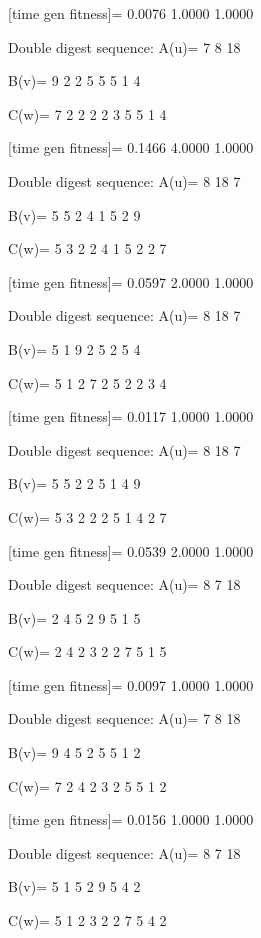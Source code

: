 [time gen fitness]=
    0.0076    1.0000    1.0000

Double digest sequence:
A(u)=
     7     8    18

B(v)=
     9     2     2     5     5     5     1     4

C(w)=
     7     2     2     2     2     3     5     5     1     4

[time gen fitness]=
    0.1466    4.0000    1.0000

Double digest sequence:
A(u)=
     8    18     7

B(v)=
     5     5     2     4     1     5     2     9

C(w)=
     5     3     2     2     4     1     5     2     2     7

[time gen fitness]=
    0.0597    2.0000    1.0000

Double digest sequence:
A(u)=
     8    18     7

B(v)=
     5     1     9     2     5     2     5     4

C(w)=
     5     1     2     7     2     5     2     2     3     4

[time gen fitness]=
    0.0117    1.0000    1.0000

Double digest sequence:
A(u)=
     8    18     7

B(v)=
     5     5     2     2     5     1     4     9

C(w)=
     5     3     2     2     2     5     1     4     2     7

[time gen fitness]=
    0.0539    2.0000    1.0000

Double digest sequence:
A(u)=
     8     7    18

B(v)=
     2     4     5     2     9     5     1     5

C(w)=
     2     4     2     3     2     2     7     5     1     5

[time gen fitness]=
    0.0097    1.0000    1.0000

Double digest sequence:
A(u)=
     7     8    18

B(v)=
     9     4     5     2     5     5     1     2

C(w)=
     7     2     4     2     3     2     5     5     1     2

[time gen fitness]=
    0.0156    1.0000    1.0000

Double digest sequence:
A(u)=
     8     7    18

B(v)=
     5     1     5     2     9     5     4     2

C(w)=
     5     1     2     3     2     2     7     5     4     2

